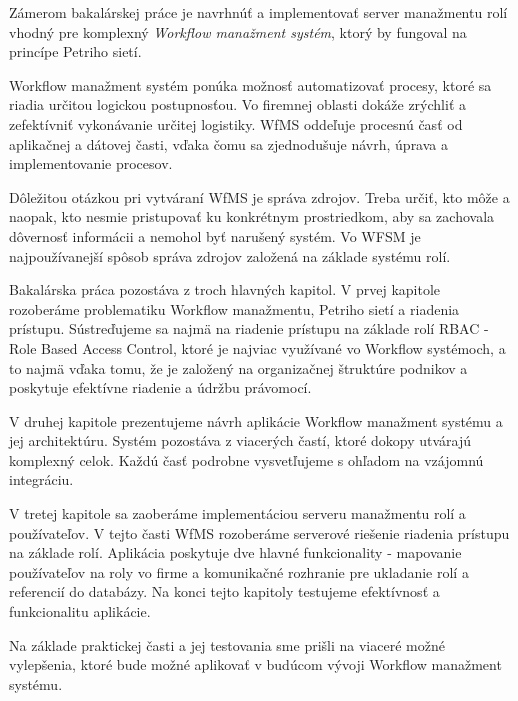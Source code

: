 Zámerom bakalárskej práce je navrhnúť a implementovať server manažmentu rolí vhodný pre komplexný \emph{Workflow manažment systém}, ktorý by fungoval na princípe Petriho sietí.

Workflow manažment systém ponúka možnosť automatizovať procesy, ktoré sa riadia určitou logickou postupnosťou. Vo firemnej oblasti dokáže zrýchliť a zefektívniť vykonávanie určitej logistiky. WfMS oddeľuje procesnú časť od aplikačnej a dátovej časti, vďaka čomu sa zjednodušuje návrh, úprava a implementovanie procesov.

Dôležitou otázkou pri vytváraní WfMS je správa zdrojov.
Treba určiť, kto môže a naopak, kto nesmie pristupovať ku konkrétnym prostriedkom,
aby sa zachovala dôvernosť informácii a nemohol byť narušený systém. Vo WFSM je
najpoužívanejší spôsob správa zdrojov založená na základe systému rolí.
 
Bakalárska práca pozostáva z troch hlavných kapitol. V prvej kapitole rozoberáme problematiku Workflow manažmentu, Petriho sietí a riadenia prístupu. Sústreďujeme sa najmä na riadenie prístupu na základe rolí RBAC - Role Based Access Control, ktoré je najviac využívané vo Workflow systémoch, a to najmä vďaka tomu, že je založený na
organizačnej štruktúre podnikov a poskytuje efektívne riadenie a údržbu právomocí. 

V druhej kapitole prezentujeme návrh aplikácie Workflow  manažment systému a jej architektúru. Systém pozostáva z viacerých častí, ktoré dokopy utvárajú komplexný celok. Každú časť podrobne vysvetľujeme s ohľadom na vzájomnú integráciu.

V tretej kapitole sa zaoberáme  implementáciou serveru manažmentu rolí a používateľov. V tejto časti WfMS rozoberáme serverové riešenie riadenia prístupu na základe rolí. Aplikácia poskytuje dve hlavné funkcionality - mapovanie používateľov na roly vo firme a komunikačné rozhranie pre ukladanie rolí a referencií do databázy. Na konci tejto kapitoly testujeme efektívnosť a funkcionalitu aplikácie.

Na základe praktickej časti a jej testovania sme prišli na viaceré možné vylepšenia, ktoré bude možné aplikovať v budúcom vývoji Workflow manažment systému. 




 




















